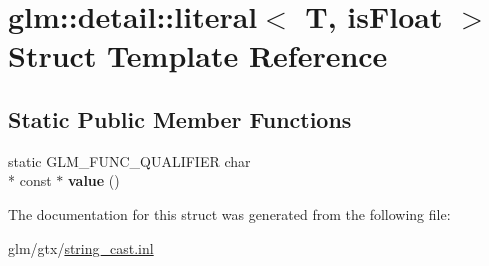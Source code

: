 \hypertarget{structglm_1_1detail_1_1literal}{\section{glm\-:\-:detail\-:\-:literal$<$ T, is\-Float $>$ Struct Template Reference}
\label{structglm_1_1detail_1_1literal}
}
\subsection*{Static Public Member Functions}
\begin{DoxyCompactItemize}
\item 
\hypertarget{structglm_1_1detail_1_1literal_a14fd9d6fec8d35f7a2fd3b0095d17b6a}{static G\-L\-M\-\_\-\-F\-U\-N\-C\-\_\-\-Q\-U\-A\-L\-I\-F\-I\-E\-R char \\*
const $\ast$ {\bfseries value} ()}\label{structglm_1_1detail_1_1literal_a14fd9d6fec8d35f7a2fd3b0095d17b6a}

\end{DoxyCompactItemize}


The documentation for this struct was generated from the following file\-:\begin{DoxyCompactItemize}
\item 
glm/gtx/\hyperlink{string__cast_8inl}{string\-\_\-cast.\-inl}\end{DoxyCompactItemize}
